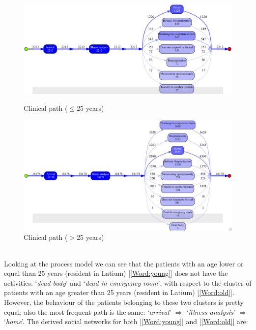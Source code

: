 \begin{figure} [htbp]
\includegraphics[width=\textwidth, keepaspectratio]{ProntoSoccorsoInductiveVisualMinerYoungs}
\caption{Clinical path ($\leq$25 years)}
\includegraphics[width=\textwidth, keepaspectratio]{ProntoSoccorsoInductiveVisualMinerOlds}
\caption{Clinical path ($>$25 years)}
\end{figure}\\
Looking at the process model we can see that the patients with an age lower or equal than 25 years (resident in Latium) [\ref{Word:young}] does not have the activities: `\textit{dead body}' and `\textit{dead in emergency room}', with respect to the cluster of patients with an age greater than 25 years (resident in Latium) [\ref{Word:old}]. However, the behaviour of the patients belonging to these two clusters is pretty equal; also the most frequent path is the same: `\textit{arrival}' $\Rightarrow$ `\textit{illness analysis}' $\Rightarrow$ `\textit{home}'. The derived social networks for both [\ref{Word:young}] and [\ref{Word:old}] are:

